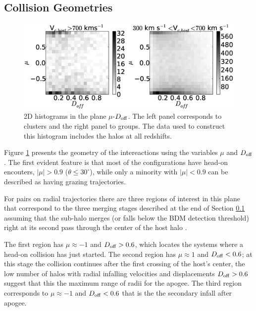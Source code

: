 \documentclass{emulateapj}
\begin{document}
\subsection{Collision Geometries}
\label{sec:geometry}

\begin{figure}
\begin{center}
\includegraphics[width=1.0\textwidth]{figure_2.eps}
\end{center}
\caption{2D histograms in the plane $\mu$-$D_{\rm off}$. The left
  panel corresponds to clusters and the right panel to groups. The data
  used to construct this histogram includes the halos at all redshifts.}
\label{fig:geometry}
\end{figure}

Figure \ref{fig:geometry} presents the geometry of the intereactions using the 
variables $\mu$ and $D_{\rm off}$. The first evident feature is that
most of the configurations have head-on encouters, $|\mu|>0.9$
($\theta\leq 30^{\circ}$), while only a minority with $|\mu|<0.9$ can
be described as having  grazing trajectories. 

For pairs on radial trajectories there are three regions of interest
in this plane that correspond to the three merging stages described
at the end of Section \ref{sec:geometry} assuming that the sub-halo
merges (or falls below the BDM detection threshold) right at its
second pass through the center of the host halo \citep{Poole2006}.  

The first region has $\mu\approx-1$ and $D_{\rm off}>0.6$, which
locates the systems where a head-on collision has just started. The
second region has $\mu\approx 1$ and $D_{\rm off}<0.6$; at this stage
the collision continues after the first crossing of the host's center,
the low number of halos with radial infalling velocities and
displacements $D_{\rm off}>0.6$ suggest that this the maximum range of
radii for the apogee.  The third region corresponds to $\mu\approx-1$
and $D_{\rm off}<0.6$ that is the the secondary infall after apogee.  
\end{document}

